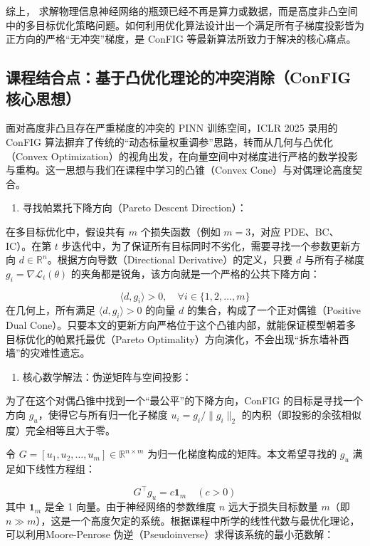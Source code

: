 \documentclass[UTF8,a4paper,12pt,fontset=none]{ctexart}
\begin{document}
综上， 求解物理信息神经网络的瓶颈已经不再是算力或数据，而是高度非凸空间中的多目标优化策略问题。如何利用优化算法设计出一个满足所有子梯度投影皆为正方向的严格“无冲突”梯度，是 ConFIG 等最新算法所致力于解决的核心痛点。



\subsection{课程结合点：基于凸优化理论的冲突消除（ConFIG核心思想）}

面对高度非凸且存在严重梯度的冲突的 PINN 训练空间，ICLR 2025 录用的 ConFIG 算法摒弃了传统的“动态标量权重调参”思路，转而从几何与凸优化（Convex Optimization）的视角出发，在向量空间中对梯度进行严格的数学投影与重构。这一思想与我们在课程中学习的凸锥（Convex Cone）与对偶理论高度契合。


\begin{enumerate}
\item 寻找帕累托下降方向（Pareto Descent Direction）：
\end{enumerate}
在多目标优化中，假设共有 $m$ 个损失函数（例如 $m=3$，对应 PDE、BC、IC）。在第 $t$ 步迭代中，为了保证所有目标同时不劣化，需要寻找一个参数更新方向 $d \in \mathbb{R}^n$。根据方向导数（Directional Derivative）的定义，只要 $d$ 与所有子梯度 $g_i = \nabla \mathcal{L}_i(\theta)$ 的夹角都是锐角，该方向就是一个严格的公共下降方向：

\[
\langle d, g_i \rangle > 0, \quad \forall i \in \{1, 2, \dots, m\}
\]
在几何上，所有满足 $\langle d, g_i \rangle > 0$ 的向量 $d$ 的集合，构成了一个正对偶锥（Positive Dual Cone）。只要本文的更新方向严格位于这个凸锥内部，就能保证模型朝着多目标优化的帕累托最优（Pareto Optimality）方向演化，不会出现“拆东墙补西墙”的灾难性遗忘。


\begin{enumerate}
\item 核心数学解法：伪逆矩阵与空间投影：
\end{enumerate}
为了在这个对偶凸锥中找到一个“最公平”的下降方向，ConFIG 的目标是寻找一个方向 $g_u$，使得它与所有归一化子梯度 $u_i = g_i / \|g_i\|_2$ 的内积（即投影的余弦相似度）完全相等且大于零。

令 $G =[u_1, u_2, \dots, u_m] \in \mathbb{R}^{n \times m}$ 为归一化梯度构成的矩阵。本文希望寻找的 $g_u$ 满足如下线性方程组：

\[
G^\top g_u = c \mathbf{1}_m \quad (c > 0)
\]
其中 $\mathbf{1}_m$ 是全 1 向量。由于神经网络的参数维度 $n$ 远大于损失目标数量 $m$（即 $n \gg m$），这是一个高度欠定的系统。根据课程中所学的线性代数与最优化理论，可以利用Moore-Penrose 伪逆（Pseudoinverse）求得该系统的最小范数解：
\end{document}
